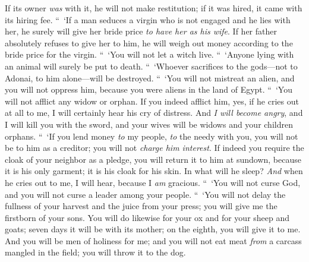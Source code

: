 \begin{biblechapter}
\verse If its owner \textit{was} with it, he will not make restitution; if it was hired, it came with its hiring fee.
 “ ‘If a man seduces a virgin who is not engaged and he lies with her, he surely will give her bride price \textit{to have her as his wife}.
\verse If her father absolutely refuses to give her to him, he will weigh out money according to the bride price for the virgin.
\verse “ ‘You will not let a witch live.
\verse “ ‘Anyone lying with an animal will surely be put to death.
\verse “ ‘Whoever sacrifices to the gods—not to Adonai, to him alone—will be destroyed.
 “ ‘You will not mistreat an alien, and you will not oppress him, because you were aliens in the land of Egypt.
\verse “ ‘You will not afflict any widow or orphan.
\verse If you indeed afflict him, yes, if he cries out at all to me, I will certainly hear his cry of distress.
\verse And \textit{I will become angry}, and I will kill you with the sword, and your wives will be widows and your children orphans.
\verse “ ‘If you lend money \textit{to} my people, \textit{to} the needy with you, you will not be to him as a creditor; you will not \textit{charge him interest}.
\verse If indeed you require the cloak of your neighbor as a pledge, you will return it to him at sundown,
\verse because it is his only garment; it is his cloak for his skin. In what will he sleep? \textit{And} when he cries out to me, I will hear, because I \textit{am} gracious.
 “ ‘You will not curse God, and you will not curse a leader among your people.
\verse “ ‘You will not delay the fullness of your harvest and the juice from your press; you will give me the firstborn of your sons.
\verse You will do likewise for your ox and for your sheep and goats; seven days it will be with its mother; on the eighth, you will give it to me.
\verse And you will be men of holiness for me; and you will not eat meat \textit{from} a carcass mangled in the field; you will throw it to the dog.
\end{biblechapter}

